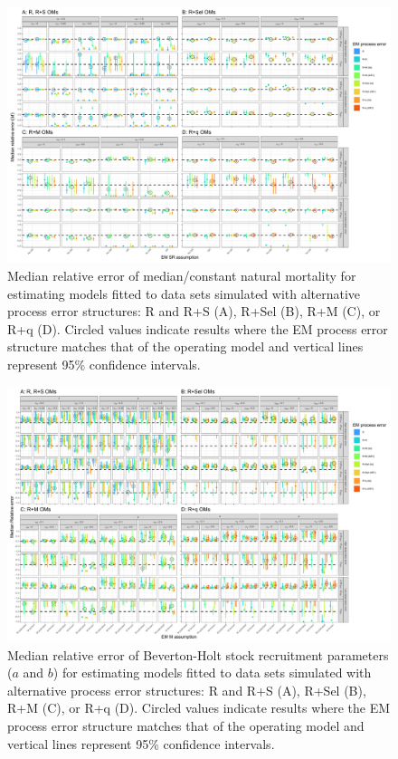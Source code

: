 \documentclass[
  12pt,
]{article}
\begin{document}
\begin{landscape}
\begin{figure}
\begin{center}
\includegraphics{M_bias_plots}
\end{center}
\caption{Median relative error of median/constant natural mortality for estimating models fitted to data sets simulated with alternative process error structures: R and R+S (A), R+Sel (B), R+M (C), or R+q (D). Circled values indicate results where the EM process error structure matches that of the operating model and vertical lines represent 95\% confidence intervals.}\label{M_rel_error}
\end{figure}
\end{landscape}

\begin{landscape}
\begin{figure}
\begin{center}
\includegraphics{sr_bias_plots}
\end{center}
\caption{Median relative error of Beverton-Holt stock recruitment parameters ($a$ and $b$) for estimating models fitted to data sets simulated with alternative process error structures: R and R+S (A), R+Sel (B), R+M (C), or R+q (D). Circled values indicate results where the EM process error structure matches that of the operating model and vertical lines represent 95\% confidence intervals.}\label{SR_rel_error}
\end{figure}
\end{landscape}
\end{document}
